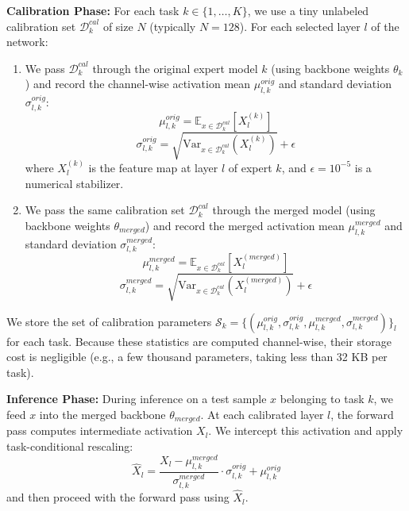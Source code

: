 \documentclass{article}
\theoremstyle{plain}
\theoremstyle{definition}
\theoremstyle{remark}
\begin{document}
\textbf{Calibration Phase:}
For each task $k \in \{1, \dots, K\}$, we use a tiny unlabeled calibration set $\mathcal{D}_k^{cal}$ of size $N$ (typically $N = 128$).
For each selected layer $l$ of the network:
\begin{enumerate}
    \item We pass $\mathcal{D}_k^{cal}$ through the original expert model $k$ (using backbone weights $\theta_k$) and record the channel-wise activation mean $\mu_{l, k}^{orig}$ and standard deviation $\sigma_{l, k}^{orig}$:
    \begin{equation}
    \mu_{l, k}^{orig} = \mathbb{E}_{x \in \mathcal{D}_k^{cal}}[X_l^{(k)}]
    \end{equation}
    \begin{equation}
    \sigma_{l, k}^{orig} = \sqrt{\text{Var}_{x \in \mathcal{D}_k^{cal}}(X_l^{(k)})} + \epsilon
    \end{equation}
    where $X_l^{(k)}$ is the feature map at layer $l$ of expert $k$, and $\epsilon = 10^{-5}$ is a numerical stabilizer.
    \item We pass the same calibration set $\mathcal{D}_k^{cal}$ through the merged model (using backbone weights $\theta_{merged}$) and record the merged activation mean $\mu_{l, k}^{merged}$ and standard deviation $\sigma_{l, k}^{merged}$:
    \begin{equation}
    \mu_{l, k}^{merged} = \mathbb{E}_{x \in \mathcal{D}_k^{cal}}[X_l^{(merged)}]
    \end{equation}
    \begin{equation}
    \sigma_{l, k}^{merged} = \sqrt{\text{Var}_{x \in \mathcal{D}_k^{cal}}(X_l^{(merged)})} + \epsilon
    \end{equation}
\end{enumerate}
We store the set of calibration parameters $\mathcal{S}_k = \{(\mu_{l, k}^{orig}, \sigma_{l, k}^{orig}, \mu_{l, k}^{merged}, \sigma_{l, k}^{merged})\}_{l}$ for each task. Because these statistics are computed channel-wise, their storage cost is negligible (e.g., a few thousand parameters, taking less than 32 KB per task).

\textbf{Inference Phase:}
During inference on a test sample $x$ belonging to task $k$, we feed $x$ into the merged backbone $\theta_{merged}$. At each calibrated layer $l$, the forward pass computes intermediate activation $X_l$. We intercept this activation and apply task-conditional rescaling:
\begin{equation}
\hat{X}_l = \frac{X_l - \mu_{l, k}^{merged}}{\sigma_{l, k}^{merged}} \cdot \sigma_{l, k}^{orig} + \mu_{l, k}^{orig}
\end{equation}
and then proceed with the forward pass using $\hat{X}_l$.
\end{document}
